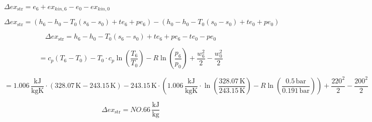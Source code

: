 \( \Delta ex_{\text{str}} = e_6 + ex_{kin,6} - e_0 - ex_{kin,0} \)  

\[
\Delta ex_{\text{str}} = \left( h_6 - h_0 - T_0 (s_6 - s_0) + te_6 + pe_6 \right) - \left( h_0 - h_0 - T_0 (s_0 - s_0) + te_0 + pe_0 \right)
\]  

\[
\Delta ex_{\text{str}} = h_6 - h_0 - T_0 (s_6 - s_0) + te_6 + pe_6 - te_0 - pe_0
\]  

\[
= c_p (T_6 - T_0) - T_0 \cdot c_p \ln \left( \frac{T_6}{T_0} \right) - R \ln \left( \frac{p_6}{p_0} \right) + \frac{w_6^2}{2} - \frac{w_0^2}{2}
\]  

\[
= 1.006 \, \frac{\text{kJ}}{\text{kgK}} \cdot \left( 328.07 \, \text{K} - 243.15 \, \text{K} \right) - 243.15 \, \text{K} \cdot \left( 1.006 \, \frac{\text{kJ}}{\text{kgK}} \cdot \ln \left( \frac{328.07 \, \text{K}}{243.15 \, \text{K}} \right) - R \ln \left( \frac{0.5 \, \text{bar}}{0.191 \, \text{bar}} \right) \right) + \frac{220^2}{2} - \frac{200^2}{2}
\]  

\[
\Delta ex_{\text{str}} = NO.66 \, \frac{\text{kJ}}{\text{kg}}
\]